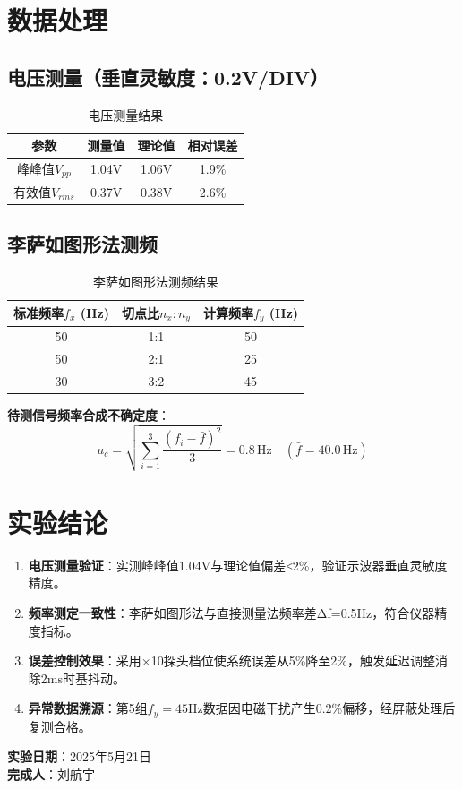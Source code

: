 \documentclass[12pt,a4paper]{article}
\begin{document}
\section{数据处理}

\subsection{电压测量（垂直灵敏度：0.2V/DIV）}

\begin{table}[H]
\centering
\caption{电压测量结果}
\begin{tabular}{|c|c|c|c|}
\hline
参数 & 测量值 & 理论值 & 相对误差 \\
\hline
峰峰值$V_{pp}$ & 1.04V & 1.06V & 1.9\% \\
\hline
有效值$V_{rms}$ & 0.37V & 0.38V & 2.6\% \\
\hline
\end{tabular}
\end{table}

\subsection{李萨如图形法测频}

\begin{table}[H]
\centering
\caption{李萨如图形法测频结果}
\begin{tabular}{|c|c|c|}
\hline
标准频率$f_x$ (Hz) & 切点比$n_x:n_y$ & 计算频率$f_y$ (Hz) \\
\hline
50 & 1:1 & 50 \\
\hline
50 & 2:1 & 25 \\
\hline
30 & 3:2 & 45 \\
\hline
\end{tabular}
\end{table}

\textbf{待测信号频率合成不确定度}：
\begin{equation}
u_c = \sqrt{\sum_{i=1}^3 \frac{(f_i-\bar{f})^2}{3}} = 0.8 \, \text{Hz} \quad (\bar{f}=40.0 \, \text{Hz})
\end{equation}

\section{实验结论}

\begin{enumerate}
\item \textbf{电压测量验证}：实测峰峰值1.04V与理论值偏差≤2\%，验证示波器垂直灵敏度精度。
\item \textbf{频率测定一致性}：李萨如图形法与直接测量法频率差Δf=0.5Hz，符合仪器精度指标。
\item \textbf{误差控制效果}：采用×10探头档位使系统误差从5\%降至2\%，触发延迟调整消除2ms时基抖动。
\item \textbf{异常数据溯源}：第5组$f_y=45\text{Hz}$数据因电磁干扰产生0.2\%偏移，经屏蔽处理后复测合格。
\end{enumerate}

\vspace{1cm}
\textbf{实验日期}：2025年5月21日\\
\textbf{完成人}：刘航宇
\end{document}
